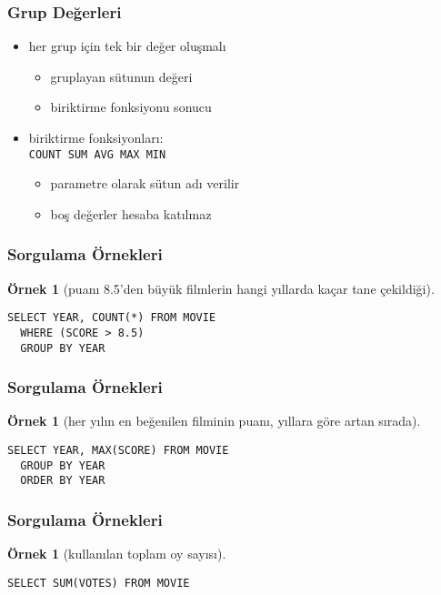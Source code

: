 \documentclass[dvipsnames]{beamer}
\theoremstyle{definition}
\theoremstyle{example}
\newtheorem{ornek}[theorem]{Örnek}
\theoremstyle{plain}
\begin{document}
\begin{frame}[fragile]
  \frametitle{Grup Değerleri}

  \begin{itemize}
    \item her grup için tek bir değer oluşmalı
    \begin{itemize}
      \item gruplayan sütunun değeri
      \item biriktirme fonksiyonu sonucu
    \end{itemize}

    \pause
    \item biriktirme fonksiyonları:\\
      \lstinline!COUNT SUM AVG MAX MIN!
    \begin{itemize}
      \item parametre olarak sütun adı verilir
      \item boş değerler hesaba katılmaz
    \end{itemize}
  \end{itemize}
\end{frame}

\begin{frame}[fragile]
  \frametitle{Sorgulama Örnekleri}

  \begin{ornek}[puanı 8.5'den büyük filmlerin hangi yıllarda kaçar tane
                çekildiği]
    \begin{lstlisting}
SELECT YEAR, COUNT(*) FROM MOVIE
  WHERE (SCORE > 8.5)
  GROUP BY YEAR
    \end{lstlisting}
  \end{ornek}
\end{frame}

\begin{frame}[fragile]
  \frametitle{Sorgulama Örnekleri}

  \begin{ornek}[her yılın en beğenilen filminin puanı, yıllara göre artan
                sırada]
    \begin{lstlisting}
SELECT YEAR, MAX(SCORE) FROM MOVIE
  GROUP BY YEAR
  ORDER BY YEAR
    \end{lstlisting}
  \end{ornek}
\end{frame}

\begin{frame}[fragile]
  \frametitle{Sorgulama Örnekleri}

  \begin{ornek}[kullanılan toplam oy sayısı]
    \begin{lstlisting}
SELECT SUM(VOTES) FROM MOVIE
    \end{lstlisting}
  \end{ornek}
\end{frame}
\end{document}
